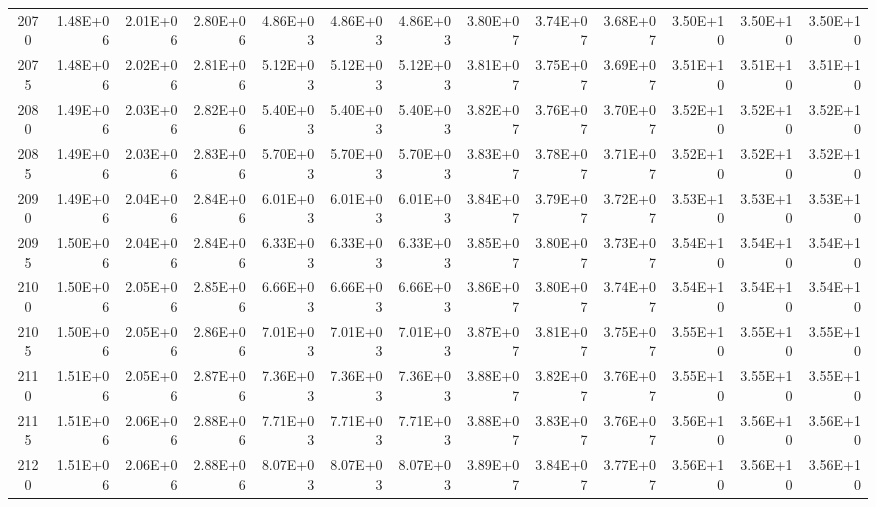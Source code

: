 \documentclass{article}
\begin{document}
\begin{table}
\begin{tabular}{crrr|rrr|rrr|rrr}
2070     & 1.48E+06   & 2.01E+06   & 2.80E+06   & 4.86E+03   & 4.86E+03   & 4.86E+03   & 3.80E+07   & 3.74E+07   & 3.68E+07   & 3.50E+10   & 3.50E+10   & 3.50E+10   \\
2075     & 1.48E+06   & 2.02E+06   & 2.81E+06   & 5.12E+03   & 5.12E+03   & 5.12E+03   & 3.81E+07   & 3.75E+07   & 3.69E+07   & 3.51E+10   & 3.51E+10   & 3.51E+10   \\
2080     & 1.49E+06   & 2.03E+06   & 2.82E+06   & 5.40E+03   & 5.40E+03   & 5.40E+03   & 3.82E+07   & 3.76E+07   & 3.70E+07   & 3.52E+10   & 3.52E+10   & 3.52E+10   \\
2085     & 1.49E+06   & 2.03E+06   & 2.83E+06   & 5.70E+03   & 5.70E+03   & 5.70E+03   & 3.83E+07   & 3.78E+07   & 3.71E+07   & 3.52E+10   & 3.52E+10   & 3.52E+10   \\
2090     & 1.49E+06   & 2.04E+06   & 2.84E+06   & 6.01E+03   & 6.01E+03   & 6.01E+03   & 3.84E+07   & 3.79E+07   & 3.72E+07   & 3.53E+10   & 3.53E+10   & 3.53E+10   \\
2095     & 1.50E+06   & 2.04E+06   & 2.84E+06   & 6.33E+03   & 6.33E+03   & 6.33E+03   & 3.85E+07   & 3.80E+07   & 3.73E+07   & 3.54E+10   & 3.54E+10   & 3.54E+10   \\
2100     & 1.50E+06   & 2.05E+06   & 2.85E+06   & 6.66E+03   & 6.66E+03   & 6.66E+03   & 3.86E+07   & 3.80E+07   & 3.74E+07   & 3.54E+10   & 3.54E+10   & 3.54E+10   \\
2105     & 1.50E+06   & 2.05E+06   & 2.86E+06   & 7.01E+03   & 7.01E+03   & 7.01E+03   & 3.87E+07   & 3.81E+07   & 3.75E+07   & 3.55E+10   & 3.55E+10   & 3.55E+10   \\
2110     & 1.51E+06   & 2.05E+06   & 2.87E+06   & 7.36E+03   & 7.36E+03   & 7.36E+03   & 3.88E+07   & 3.82E+07   & 3.76E+07   & 3.55E+10   & 3.55E+10   & 3.55E+10   \\
2115     & 1.51E+06   & 2.06E+06   & 2.88E+06   & 7.71E+03   & 7.71E+03   & 7.71E+03   & 3.88E+07   & 3.83E+07   & 3.76E+07   & 3.56E+10   & 3.56E+10   & 3.56E+10   \\
2120     & 1.51E+06   & 2.06E+06   & 2.88E+06   & 8.07E+03   & 8.07E+03   & 8.07E+03   & 3.89E+07   & 3.84E+07   & 3.77E+07   & 3.56E+10   & 3.56E+10   & 3.56E+10  
\end{tabular}
\end{table}
\end{document}
